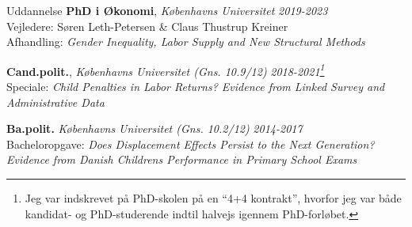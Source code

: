 \documentclass[
	11pt, %
]{resume} %
\begin{document}

\begin{rSection}{Uddannelse}
    \textbf{PhD i Økonomi}, \textit{Københavns Universitet} \hfill \textit{2019-2023} \\
    Vejledere: Søren Leth-Petersen \& Claus Thustrup Kreiner \\
    Afhandling: \textit{Gender Inequality, Labor Supply and New Structural Methods}

    \textbf{Cand.polit.}, \textit{Københavns Universitet (Gns. 10.9/12)} \hfill \textit{2018-2021\footnote{Jeg var indskrevet på PhD-skolen på en ``4+4 kontrakt'', hvorfor jeg var både kandidat- og PhD-studerende indtil halvejs igennem PhD-forløbet.}} \\
    Speciale: \textit{Child Penalties in Labor Returns? Evidence from Linked Survey and Administrative Data}

    \textbf{Ba.polit.} \textit{Københavns Universitet (Gns. 10.2/12)} \hfill \textit{2014-2017} \\
    Bacheloropgave: \textit{Does Displacement Effects Persist to the Next Generation? Evidence from Danish Childrens Performance in Primary School Exams}
\end{rSection}

\end{document}
